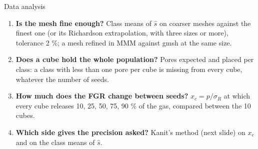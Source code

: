 \documentclass[10pt,aspectratio=169]{beamer}
\begin{document}
\begin{frame}{Data analysis}
\begin{enumerate}
\item \textbf{Is the mesh fine enough?} Class means of $\hat s$ on coarser meshes against the finest one (or its
      Richardson extrapolation, with three sizes or more), tolerance 2 \%; a mesh refined in MMM against gmsh at the
      same size.
\item \textbf{Does a cube hold the whole population?} Pores expected and placed per class: a class with less than one
      pore per cube is missing from every cube, whatever the number of seeds.
\item \textbf{How much does the FGR change between seeds?} $x_c=p/\sigma_R$ at which every cube releases 10, 25, 50, 75,
      90 \% of the gas, compared between the 10 cubes.
\item \textbf{Which side gives the precision asked?} Kanit's method (next slide) on $x_c$ and on the class means of
      $\hat s$.
\end{enumerate}
 
\end{frame}
\end{document}

